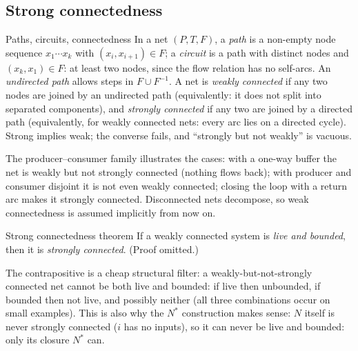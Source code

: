 \subsection{Strong connectedness}

\begin{definitionbox}{Paths, circuits, connectedness}
In a net $(P, T, F)$, a \emph{path} is a non-empty node sequence $x_1 \cdots x_k$ with $(x_i, x_{i+1}) \in F$; a \emph{circuit} is a path with distinct nodes and $(x_k, x_1) \in F$: at least two nodes, since the flow relation has no self-arcs. An \emph{undirected path} allows steps in $F \cup F^{-1}$. A net is \emph{weakly connected} if any two nodes are joined by an undirected path (equivalently: it does not split into separated components), and \emph{strongly connected} if any two are joined by a directed path (equivalently, for weakly connected nets: every arc lies on a directed cycle). Strong implies weak; the converse fails, and ``strongly but not weakly'' is vacuous.
\end{definitionbox}

The producer--consumer family illustrates the cases: with a one-way buffer the net is weakly but not strongly connected (nothing flows back); with producer and consumer disjoint it is not even weakly connected; closing the loop with a return arc makes it strongly connected. Disconnected nets decompose, so weak connectedness is assumed implicitly from now on.

\begin{definitionbox}{Strong connectedness theorem}
If a weakly connected system is \emph{live and bounded}, then it is \emph{strongly connected}. (Proof omitted.)
\end{definitionbox}

The contrapositive is a cheap structural filter: a weakly-but-not-strongly connected net cannot be both live and bounded: if live then unbounded, if bounded then not live, and possibly neither (all three combinations occur on small examples). This is also why the $N^*$ construction makes sense: $N$ itself is never strongly connected ($i$ has no inputs), so it can never be live and bounded: only its closure $N^*$ can.

